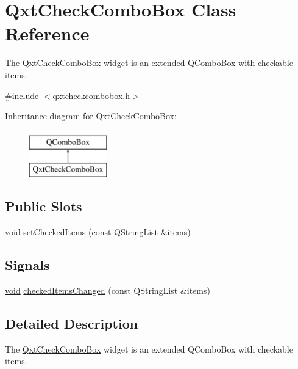 \hypertarget{class_qxt_check_combo_box}{\section{Qxt\-Check\-Combo\-Box Class Reference}
\label{class_qxt_check_combo_box}
}


The \hyperlink{class_qxt_check_combo_box}{Qxt\-Check\-Combo\-Box} widget is an extended Q\-Combo\-Box with checkable items.  




{\ttfamily \#include $<$qxtcheckcombobox.\-h$>$}

Inheritance diagram for Qxt\-Check\-Combo\-Box\-:\begin{figure}[H]
\begin{center}
\leavevmode
\includegraphics[height=2.000000cm]{class_qxt_check_combo_box}
\end{center}
\end{figure}
\subsection*{Public Slots}
\begin{DoxyCompactItemize}
\item 
\hyperlink{group___u_a_v_objects_plugin_ga444cf2ff3f0ecbe028adce838d373f5c}{void} \hyperlink{class_qxt_check_combo_box_aad012b000d82a66ee34cf3908acdc520}{set\-Checked\-Items} (const Q\-String\-List \&items)
\end{DoxyCompactItemize}
\subsection*{Signals}
\begin{DoxyCompactItemize}
\item 
\hyperlink{group___u_a_v_objects_plugin_ga444cf2ff3f0ecbe028adce838d373f5c}{void} \hyperlink{class_qxt_check_combo_box_ac3c7d2e38bb500b0276e23537e9c664d}{checked\-Items\-Changed} (const Q\-String\-List \&items)
\end{DoxyCompactItemize}


\subsection{Detailed Description}
The \hyperlink{class_qxt_check_combo_box}{Qxt\-Check\-Combo\-Box} widget is an extended Q\-Combo\-Box with checkable items. 

